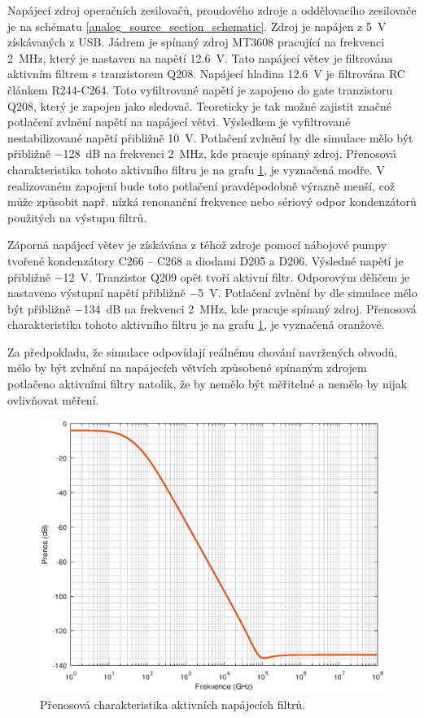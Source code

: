 Napájecí zdroj operačních zesilovačů, proudového zdroje a oddělovacího zesilovače je na schématu \ref{analog_source_section_schematic}. Zdroj je napájen z \SI{5}{\volt} získávaných z USB. Jádrem je spínaný zdroj MT3608 pracující na frekvenci \SI{2}{\mega\hertz}, který je nastaven na napětí \SI{12.6}{\volt}. Tato napájecí větev je filtrována aktivním filtrem s tranzistorem Q208. Napájecí hladina \SI{12.6}{\volt} je filtrována RC článkem R244-C264. Toto vyfiltrované napětí je zapojeno do gate tranzistoru Q208, který je zapojen jako sledovač. Teoreticky je tak možné zajistit značné potlačení zvlnění napětí na napájecí větvi. Výsledkem je vyfiltrované nestabilizované napětí přibližně \SI{10}{\volt}. Potlačení zvlnění by dle simulace mělo být přibližně \SI{-128}{\deci\bel} na frekvenci \SI{2}{\mega\hertz}, kde pracuje spínaný zdroj. Přenosová charakteristika tohoto aktivního filtru je na grafu \ref{analog_source_filter_transfer}, je vyznačená modře. V realizovaném zapojení bude toto potlačení pravděpodobně výrazně menší, což může způsobit např. nízká renonanční frekvence nebo sériový odpor kondenzátorů použitých na výstupu filtrů.

Záporná napájecí větev je získávána z téhož zdroje pomocí nábojové pumpy tvořené kondenzátory C266 -- C268 a diodami D205 a D206. Výsledné napětí je přibližně \SI{-12}{\volt}. Tranzistor Q209 opět tvoří aktivní filtr. Odporovým děličem je nastaveno výstupní napětí přibližně \SI{-5}{\volt}. Potlačení zvlnění by dle simulace mělo být přibližně \SI{-134}{\deci\bel} na frekvenci \SI{2}{\mega\hertz}, kde pracuje spínaný zdroj. Přenosová charakteristika tohoto aktivního filtru je na grafu \ref{analog_source_filter_transfer}, je vyznačená oranžově.

Za předpokladu, že simulace odpovídají reálnému chování navržených obvodů, mělo by být zvlnění na napájecích větvích způsobené spínaným zdrojem potlačeno aktivními filtry natolik, že by nemělo být měřitelné a nemělo by nijak ovlivňovat měření.

\begin{figure}[htbp]
\includegraphics[width=\textwidth,keepaspectratio]{images/denoiser_transfer_function.eps}\caption{Přenosová charakteristika aktivních napájecích filtrů.}\label{analog_source_filter_transfer}
\end{figure}

